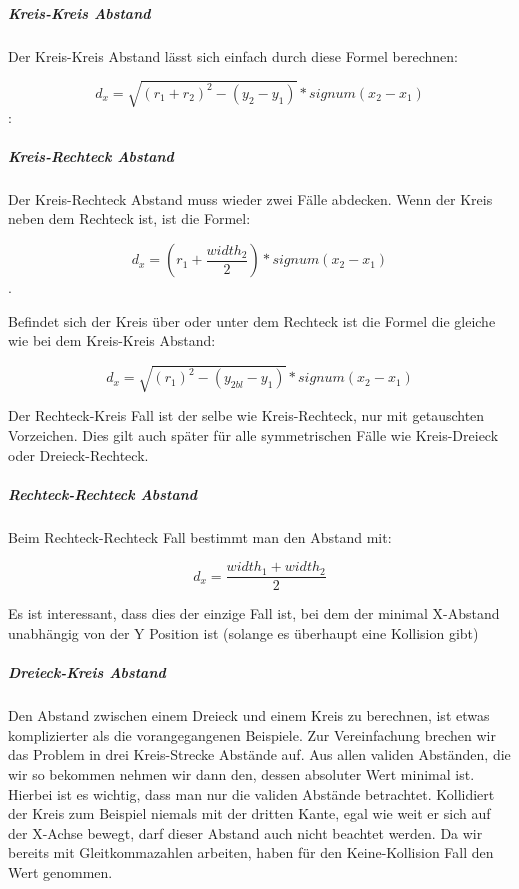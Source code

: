 \subparagraph{Kreis-Kreis Abstand}

Der Kreis-Kreis Abstand lässt sich einfach durch diese Formel berechnen:

$$d_x = \sqrt{(r_1 + r_2)^2 - (y_2 - y_1)} * signum(x_2 - x_1)$$:


\subparagraph{Kreis-Rechteck Abstand}

Der Kreis-Rechteck Abstand muss wieder zwei Fälle abdecken. Wenn der Kreis neben dem Rechteck ist, ist die Formel:

$$d_x = (r_1 + \frac{width_2}{2}) * signum(x_2 - x_1)$$. 

Befindet sich der Kreis über oder unter dem Rechteck ist die Formel die gleiche wie bei dem Kreis-Kreis Abstand:

$$d_x = \sqrt{(r_1)^2 - (y_{2bl} - y_1)} * signum(x_2 - x_1)$$


Der Rechteck-Kreis Fall ist der selbe wie Kreis-Rechteck, nur mit getauschten Vorzeichen. Dies gilt auch später für alle symmetrischen Fälle wie Kreis-Dreieck oder Dreieck-Rechteck.

\subparagraph{Rechteck-Rechteck Abstand}

Beim Rechteck-Rechteck Fall bestimmt man den Abstand mit:

$$d_x = \frac{width_1 + width_2}{2}$$


Es ist interessant, dass dies der einzige Fall ist, bei dem der minimal X-Abstand unabhängig von der Y Position ist (solange es überhaupt eine Kollision gibt)

\subparagraph{Dreieck-Kreis Abstand}

Den Abstand zwischen einem Dreieck und einem Kreis zu berechnen, ist etwas komplizierter als die vorangegangenen Beispiele. Zur Vereinfachung brechen wir das Problem in drei Kreis-Strecke Abstände auf. Aus allen validen Abständen, die wir so bekommen nehmen wir dann den, dessen absoluter Wert minimal ist. Hierbei ist es wichtig, dass man nur die validen Abstände  betrachtet. Kollidiert der Kreis zum Beispiel niemals mit der dritten Kante, egal wie weit er sich auf der X-Achse bewegt, darf dieser Abstand auch nicht beachtet werden. 
Da wir bereits mit Gleitkommazahlen arbeiten, haben für den Keine-Kollision Fall den Wert  genommen.

